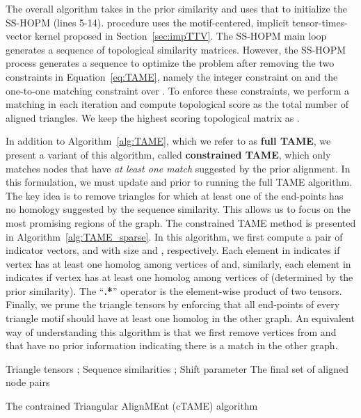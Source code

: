 \documentclass[10pt, journal, compsoc, final]{IEEEtran}
\newcommand{\Matrix}[1]{\mathbf{#1}}
\begin{document}
The overall algorithm takes in the prior similarity and uses that to initialize the SS-HOPM (lines 5-14).  procedure uses the motif-centered, implicit tensor-times-vector kernel proposed in Section~\ref{sec:impTTV}. The SS-HOPM main loop generates a sequence of topological similarity 
matrices. However, the SS-HOPM process generates a sequence to optimize the problem after removing
the two constraints in Equation~\ref{eq:TAME}, namely the integer constraint on  and the one-to-one matching 
constraint over . 
To enforce these constraints, we perform a matching in each iteration and compute topological score as the total number of aligned triangles. We keep the highest scoring topological matrix as .

In addition to Algorithm~\ref{alg:TAME}, which we refer to as \textbf{full TAME}, we present a 
variant of this algorithm, called \textbf{constrained TAME}, which only matches nodes that 
have \emph{at least one match} suggested by the prior alignment. In this formulation, we 
must update  and  prior to running the 
full TAME algorithm. The key idea is to remove triangles for which at least one of the end-points
has no homology suggested by the sequence similarity.
This allows us to focus on the most promising regions of the graph. The constrained TAME method
is presented in Algorithm~\ref{alg:TAME_sparse}. In this algorithm, we first compute a pair
of indicator vectors, 
 and  with size  and , 
respectively. Each element  in  indicates if vertex  has at least 
one homolog among vertices of  and, similarly, each element  in  
indicates if vertex  has at least one homolog among vertices of  (determined
by the prior similarity). The 
``\textbf{.*}'' operator is the element-wise product of two tensors. Finally, we prune the triangle 
tensors by enforcing that all end-points of every triangle motif should have at least one homolog 
in the other graph. An equivalent way of understanding this algorithm is that we first remove
vertices from  and  that have no prior information indicating there is
a match in the other graph. 


\begin{algorithm}
\centering
\begin{algorithmic}[1]
\REQUIRE Triangle tensors ;   Sequence similarities ; Shift parameter 
\ENSURE The final set of aligned node pairs 
\STATE 
\STATE \Matrix{W}
\STATE \Matrix{W}
\STATE 
\STATE 
\STATE 
\STATE 
\STATE 
\end{algorithmic}
\caption{The contrained Triangular AlignMEnt (cTAME) algorithm}
\label{alg:TAME_sparse}
\end{algorithm}
\end{document}
